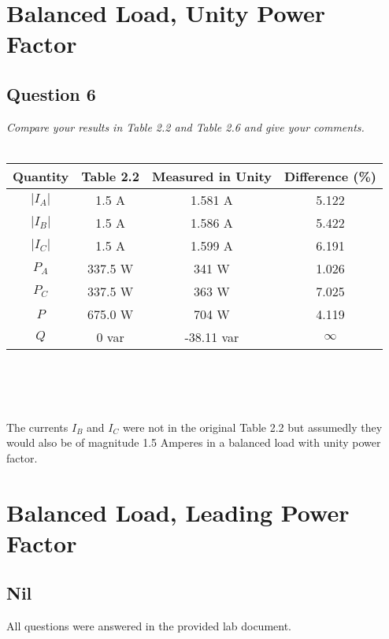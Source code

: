 \documentclass{article}
\begin{document}
  \clearpage

\section{Balanced Load, Unity Power Factor}
  \subsection{Question 6}
  \textit{Compare your results in Table 2.2 and Table 2.6 and give your comments.} \\ \\
  \begin{centering}
  \begin{tabular}{|c|c|c|c|} \hline
    Quantity    & Table 2.2 & Measured in Unity  & Difference (\%)  \\ \hline
    $|I_{A}|$   & 1.5 A     & 1.581 A     &  5.122    \\ \hline
    $|I_{B}|$   & 1.5 A     & 1.586 A     &  5.422    \\ \hline
    $|I_{C}|$   & 1.5 A     & 1.599 A     &  6.191    \\ \hline
    $P_{A}$     & 337.5 W   & 341 W       &  1.026    \\ \hline
    $P_{C}$     & 337.5 W   & 363 W       &  7.025    \\ \hline
    $P$         & 675.0 W   & 704 W       &  4.119    \\ \hline
    $Q$         & 0 var     & -38.11 var  & $\infty$  \\ \hline
  \end{tabular} \\ 
  \end{centering} 
  \noindent \\ \\
  The currents $I_{B}$ and $I_{C}$ were not in the original Table 2.2 but assumedly they would also be of magnitude 1.5 Amperes in a balanced load with unity power factor. \par
  
  \clearpage


\section{Balanced Load, Leading Power Factor}
  \subsection{Nil}
    All questions were answered in the provided lab document.
  \clearpage
\end{document}
